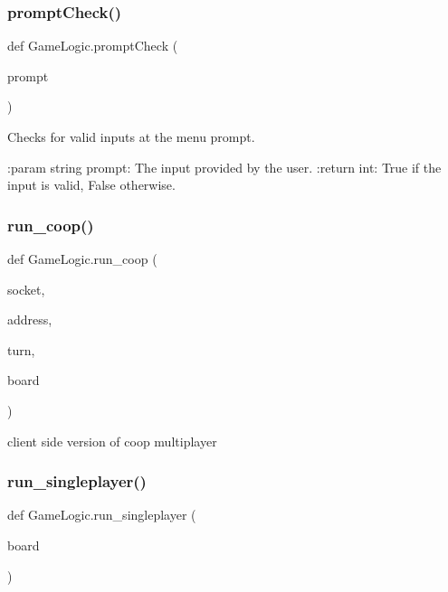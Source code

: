 \subsubsection{\texorpdfstring{prompt\+Check()}{promptCheck()}}
{\footnotesize\ttfamily def Game\+Logic.\+prompt\+Check (\begin{DoxyParamCaption}\item[{}]{prompt }\end{DoxyParamCaption})}

\begin{DoxyVerb}Checks for valid inputs at the menu prompt.

:param string prompt: The input provided by the user.
:return int: True if the input is valid, False otherwise.
\end{DoxyVerb}
 \mbox{\label{namespace_game_logic_afc48c64dfaba7c18f642ab23e8e3a3bf}} 
\subsubsection{\texorpdfstring{run\+\_\+coop()}{run\_coop()}}
{\footnotesize\ttfamily def Game\+Logic.\+run\+\_\+coop (\begin{DoxyParamCaption}\item[{}]{socket,  }\item[{}]{address,  }\item[{}]{turn,  }\item[{}]{board }\end{DoxyParamCaption})}

\begin{DoxyVerb}client side version of coop multiplayer
\end{DoxyVerb}
 \mbox{\label{namespace_game_logic_aa19068ecba13ba5dae3258c28138983d}} 
\subsubsection{\texorpdfstring{run\+\_\+singleplayer()}{run\_singleplayer()}}
{\footnotesize\ttfamily def Game\+Logic.\+run\+\_\+singleplayer (\begin{DoxyParamCaption}\item[{}]{board }\end{DoxyParamCaption})}

